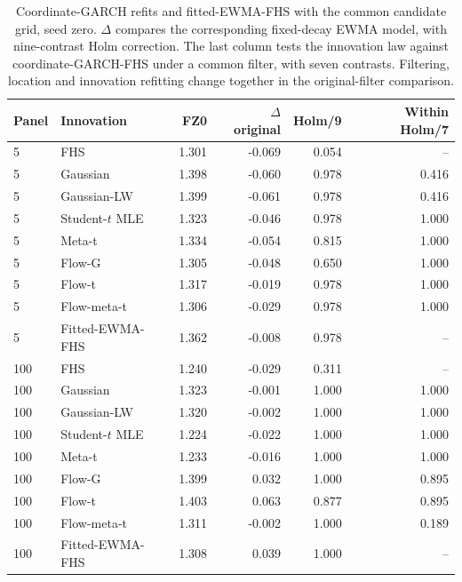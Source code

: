 \documentclass[11pt]{article}
\theoremstyle{definition}\newtheorem{definition}[theorem]{Definition}
\theoremstyle{remark}\newtheorem{remark}[theorem]{Remark}
\begin{document}
\begin{table}[htbp]
\centering\footnotesize
\setlength{\tabcolsep}{4pt}
\begin{tabular}{llrrrr}
\toprule
Panel & Innovation & FZ0 & $\Delta$ original & Holm/9 & Within Holm/7 \\
\midrule
5 & FHS & 1.301 & -0.069 & 0.054 & -- \\
5 & Gaussian & 1.398 & -0.060 & 0.978 & 0.416 \\
5 & Gaussian-LW & 1.399 & -0.061 & 0.978 & 0.416 \\
5 & Student-$t$ MLE & 1.323 & -0.046 & 0.978 & 1.000 \\
5 & Meta-t & 1.334 & -0.054 & 0.815 & 1.000 \\
5 & Flow-G & 1.305 & -0.048 & 0.650 & 1.000 \\
5 & Flow-t & 1.317 & -0.019 & 0.978 & 1.000 \\
5 & Flow-meta-t & 1.306 & -0.029 & 0.978 & 1.000 \\
5 & Fitted-EWMA-FHS & 1.362 & -0.008 & 0.978 & -- \\
100 & FHS & 1.240 & -0.029 & 0.311 & -- \\
100 & Gaussian & 1.323 & -0.001 & 1.000 & 1.000 \\
100 & Gaussian-LW & 1.320 & -0.002 & 1.000 & 1.000 \\
100 & Student-$t$ MLE & 1.224 & -0.022 & 1.000 & 1.000 \\
100 & Meta-t & 1.233 & -0.016 & 1.000 & 1.000 \\
100 & Flow-G & 1.399 & 0.032 & 1.000 & 0.895 \\
100 & Flow-t & 1.403 & 0.063 & 0.877 & 0.895 \\
100 & Flow-meta-t & 1.311 & -0.002 & 1.000 & 0.189 \\
100 & Fitted-EWMA-FHS & 1.308 & 0.039 & 1.000 & -- \\
\bottomrule
\end{tabular}
\caption{Coordinate-GARCH refits and fitted-EWMA-FHS with the common candidate grid, seed zero. $\Delta$ compares the corresponding fixed-decay EWMA model, with nine-contrast Holm correction. The last column tests the innovation law against coordinate-GARCH-FHS under a common filter, with seven contrasts. Filtering, location and innovation refitting change together in the original-filter comparison.}\label{tab:r4-coordinate}
\end{table}
\end{document}
